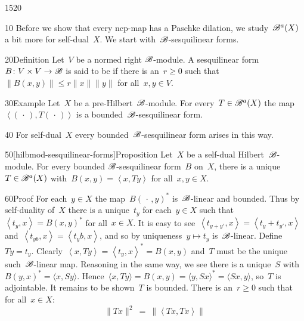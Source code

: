 \begin{parsec}{1520}%
\begin{point}{10}%
    Before we show that every ncp-map has a Paschke dilation,
        we study~$\mathscr{B}^a(X)$ a bit more for self-dual~$X$.
    We start with~$\mathscr{B}$-sesquilinear forms.
\end{point}
\begin{point}{20}{Definition}%
Let~$V$ be a normed right $\mathscr{B}$-module.
A sesquilinear form~$B\colon V\times V \to \mathscr{B}$
is said to be 
    if there is an~$r \geq 0$ such that
$\|B(x,y)\| \leq r \|x\|\|y\|$
for all~$x,y \in V$.
\end{point}
\begin{point}{30}{Example}%
Let~$X$ be a pre-Hilbert~$\mathscr{B}$-module.
For every~$T \in \mathscr{B}^a(X)$
    the map~$\left<(\,\cdot\,), T (\,\cdot\,)\right>$
    is a bounded~$\mathscr{B}$-sesquilinear form.
\begin{point}{40}%
    For self-dual~$X$ every bounded~$\mathscr{B}$-sesquilinear form
        arises in this way.
\end{point}
\end{point}
\begin{point}{50}[hilbmod-sesquilinear-forms]{Proposition}%
Let~$X$ be a self-dual Hilbert~$\mathscr{B}$-module.
For every bounded $\mathscr{B}$-sesquilinear form~$B$ on~$X$,
    there is a unique~$T \in \mathscr{B}^a(X)$
    with~$B(x,y) = \left<x,Ty\right>$
    for all~$x,y \in X$.
\begin{point}{60}{Proof}
For each~$y \in X$
    the map~$B(\,\cdot\,,y)^*$ is~$\mathscr{B}$-linear and bounded.
Thus by self-duality of~$X$
there is a unique~$t_y$
    for each~$y \in X$
    such that~$\left<t_y, x\right> = B(x,y)^*$
    for all~$x \in X$.
It is easy to see~$\left<t_{y+y'},x\right>
                = \left<t_y + t_{y'}, x\right>$
                and~$\left<t_{yb},x\right>
                = \left<t_y b, x\right>$,
    and so by uniqueness~$y \mapsto t_y$ is~$\mathscr{B}$-linear.
Define~$Ty = t_y$.
Clearly~$\left<x,Ty\right> = \left<t_y,x\right>^* = B(x,y)$
    and~$T$ must be the unique such~$\mathscr{B}$-linear map.
Reasoning in the same way,
    we see there is a unique~$S$
    with~$B(y,x)^* = \langle x, S y \rangle$.
Hence~$\langle x, T y\rangle = B(x,y) 
        = \langle y, Sx\rangle^* = \langle Sx, y \rangle$,
        so~$T$ is adjointable.
It remains to be shown~$T$ is bounded.
There is an~$r \geq 0$ such that for all~$x \in X$:
\begin{equation*}
    \| Tx\|^2 
    \ =\  \|\left<Tx,Tx\right>\|

\end{equation*}
\end{point}
\end{point}
\end{parsec}
